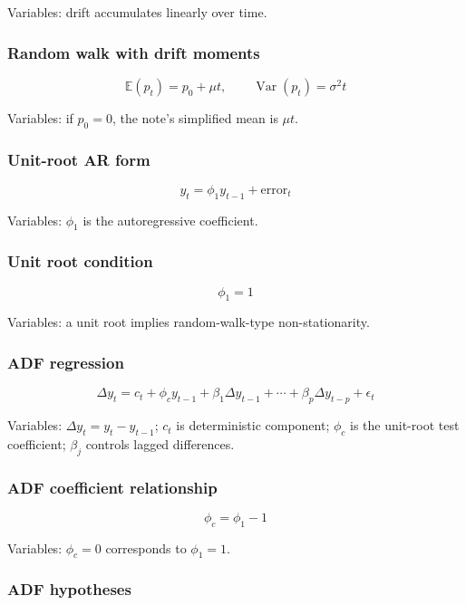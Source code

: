 \documentclass[
  8pt,
  twocolumn]{extarticle}
\begin{document}
Variables: drift accumulates linearly over time.

\subsubsection{Random walk with drift
moments}\label{random-walk-with-drift-moments}

\[
\mathbb E(p_t)=p_0+\mu t,\qquad \operatorname{Var}(p_t)=\sigma^2t
\]

Variables: if \(p_0=0\), the note's simplified mean is \(\mu t\).

\subsubsection{Unit-root AR form}\label{unit-root-ar-form}

\[
y_t=\phi_1y_{t-1}+\text{error}_t
\]

Variables: \(\phi_1\) is the autoregressive coefficient.

\subsubsection{Unit root condition}\label{unit-root-condition}

\[
\phi_1=1
\]

Variables: a unit root implies random-walk-type non-stationarity.

\subsubsection{ADF regression}\label{adf-regression}

\[
\Delta y_t=c_t+\phi_cy_{t-1}+\beta_1\Delta y_{t-1}+\cdots+\beta_p\Delta y_{t-p}+\epsilon_t
\]

Variables: \(\Delta y_t=y_t-y_{t-1}\); \(c_t\) is deterministic
component; \(\phi_c\) is the unit-root test coefficient; \(\beta_j\)
controls lagged differences.

\subsubsection{ADF coefficient
relationship}\label{adf-coefficient-relationship}

\[
\phi_c=\phi_1-1
\]

Variables: \(\phi_c=0\) corresponds to \(\phi_1=1\).

\subsubsection{ADF hypotheses}\label{adf-hypotheses}
\end{document}
